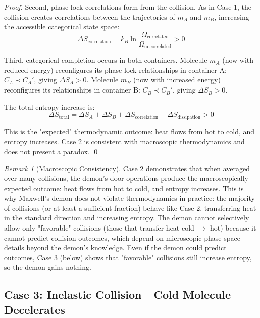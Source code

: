 \documentclass[12pt,a4paper]{article}
\theoremstyle{definition}
\theoremstyle{remark}
\newtheorem{remark}[theorem]{Remark}
\begin{document}
\begin{proof}
Second, phase-lock correlations form from the collision. As in Case 1, the collision creates correlations between the trajectories of $m_A$ and $m_B$, increasing the accessible categorical state space:
\begin{equation}
\Delta S_{\text{correlation}} = k_B \ln \frac{\Omega_{\text{correlated}}}{\Omega_{\text{uncorrelated}}} > 0
\end{equation}

Third, categorical completion occurs in both containers. Molecule $m_A$ (now with reduced energy) reconfigures its phase-lock relationships in container A: $C_A \prec C_A'$, giving $\Delta S_A > 0$. Molecule $m_B$ (now with increased energy) reconfigures its relationships in container B: $C_B \prec C_B'$, giving $\Delta S_B > 0$.

The total entropy increase is:
\begin{equation}
\Delta S_{\text{total}} = \Delta S_A + \Delta S_B + \Delta S_{\text{correlation}} + \Delta S_{\text{dissipation}} > 0
\end{equation}

This is the "expected" thermodynamic outcome: heat flows from hot to cold, and entropy increases. Case 2 is consistent with macroscopic thermodynamics and does not present a paradox. \qed
\end{proof}

\begin{remark}[Macroscopic Consistency]
\label{rem:macroscopic_consistency}
Case 2 demonstrates that when averaged over many collisions, the demon's door operations produce the macroscopically expected outcome: heat flows from hot to cold, and entropy increases. This is why Maxwell's demon does not violate thermodynamics in practice: the majority of collisions (or at least a sufficient fraction) behave like Case 2, transferring heat in the standard direction and increasing entropy. The demon cannot selectively allow only "favorable" collisions (those that transfer heat cold $\to$ hot) because it cannot predict collision outcomes, which depend on microscopic phase-space details beyond the demon's knowledge. Even if the demon could predict outcomes, Case 3 (below) shows that "favorable" collisions still increase entropy, so the demon gains nothing.
\end{remark}

\subsection{Case 3: Inelastic Collision—Cold Molecule Decelerates}
\end{document}

